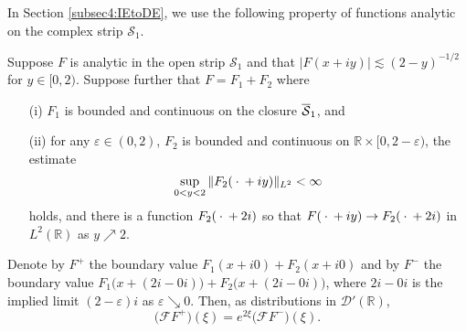 \documentclass[../dissertation.tex]{subfiles}
\begin{document}
In Section \ref{subsec4:IEtoDE}, we use the following property of functions analytic
on the complex strip $\mathcal S_1$. 
\begin{prop}\label{prop3:BndryRelProp}
	Suppose $F$ is analytic in the open strip $\mathcal S_1$ and that 
	$|F(x+iy)| \lesssim (2-y)^{-1/2}$ for $y \in [0,2)$. Suppose further that 
	$F=F_1+F_2$ where
	\begin{itemize}
		\item[(i)] $F_1$ is bounded and continuous on the closure $\overline{\mathcal S}_1$,
			and
		\item[(ii)] for any $\varepsilon \in (0, 2)$, $F_2$ is bounded and continuous
			on $\mathbb R \times [0, 2-\varepsilon)$, the estimate
			\[
				\sup_{0< y< 2} \|F_2(\kern 0.5ex \cdot \kern 0.5ex + iy)\|_{L^2} < \infty
			\]
			holds, and there is a function $F_2(\kern 0.5ex \cdot \kern 0.5ex + 2i)$ so that 
			$F(\kern 0.5ex \cdot \kern 0.5ex + iy) \to F_2(\kern 0.5ex \cdot \kern 0.5ex + 2i)$ in $L^2(\mathbb R)$
			as $y\nearrow 2$. 
	\end{itemize}
	Denote by $F^+$ the boundary value $F_1(x+ i0) + F_2( x + i0)$ and by 
	$F^-$ the boundary value $F_1\big(x + (2i-0i)\big) + F_2\big(x + (2i-0i)\big)$, 
	where $2i-0i$ is the implied limit $(2-\varepsilon)i$ as $\varepsilon \searrow0$.
	Then, as distributions in $\mathcal D'(\mathbb R)$,
	\[
		\big(\mathcal F F^+\big)(\xi) = e^{2\xi} \big(\mathcal F F^-\big)(\xi).
	\]
\end{prop}
\end{document}
